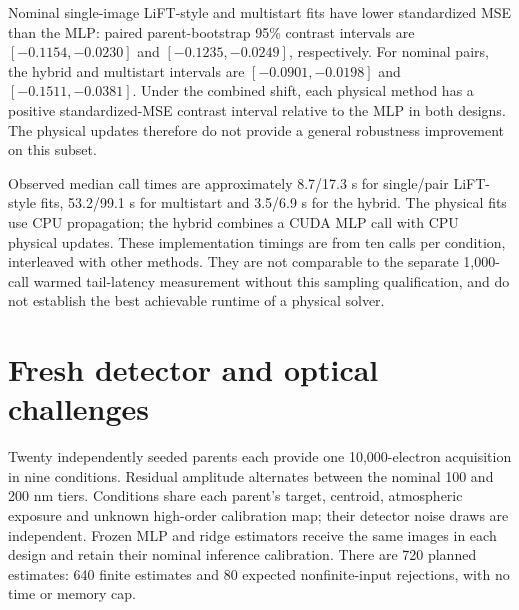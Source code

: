 \documentclass[11pt,a4paper]{article}
\begin{document}
Nominal single-image LiFT-style and multistart fits have lower standardized
MSE than the MLP: paired parent-bootstrap 95\% contrast intervals are
$[-0.1154,-0.0230]$ and $[-0.1235,-0.0249]$, respectively.
For nominal pairs, the hybrid and multistart intervals are
$[-0.0901,-0.0198]$ and $[-0.1511,-0.0381]$.
Under the combined shift, each physical method has a positive standardized-MSE
contrast interval relative to the MLP in both designs. The physical updates
therefore do not provide a general robustness improvement on this subset.

Observed median call times are approximately 8.7/17.3 s for single/pair
LiFT-style fits, 53.2/99.1 s for multistart and 3.5/6.9 s for the hybrid.
The physical fits use CPU propagation; the hybrid combines a CUDA MLP call
with CPU physical updates.
These implementation timings are from ten calls per condition, interleaved
with other methods. They are not comparable to the separate 1,000-call warmed
tail-latency measurement without this sampling qualification, and do not
establish the best achievable runtime of a physical solver.

\section{Fresh detector and optical challenges}
Twenty independently seeded parents each provide one 10,000-electron acquisition
in nine conditions. Residual amplitude alternates between the nominal 100 and
200 nm tiers. Conditions share each parent's target, centroid, atmospheric
exposure and unknown high-order calibration map; their detector noise draws
are independent. Frozen MLP and ridge estimators receive the same images in
each design and retain their nominal inference calibration. There are 720
planned estimates: 640 finite estimates and 80 expected nonfinite-input rejections,
with no time or memory cap.
\end{document}
